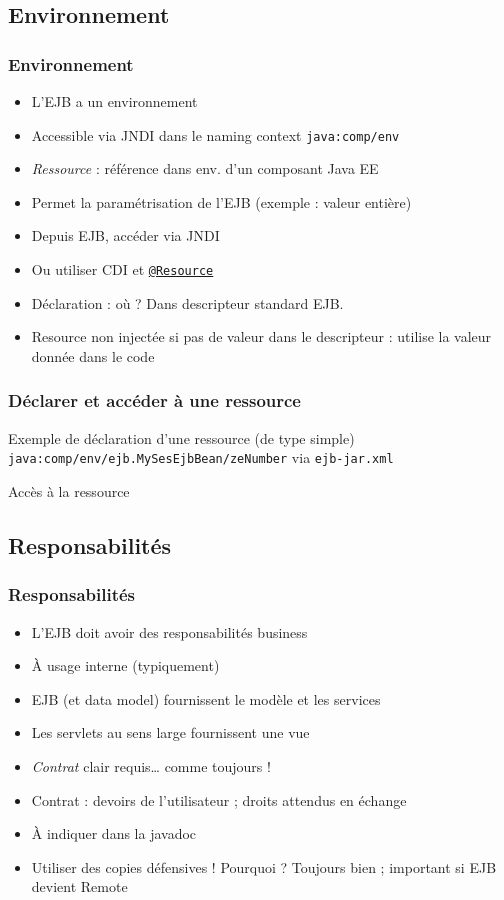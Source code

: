 \documentclass[english, french]{beamer}
\begin{document}
\subsection{Environnement}
\begin{frame}
	\frametitle{Environnement}
	\begin{itemize}
		\item L’EJB a un environnement
		\item Accessible via JNDI dans le naming context \texttt{java:comp/env}
		\item \emph{Ressource} : référence dans env. d’un composant Java EE
		\item Permet la paramétrisation de l’EJB (exemple : valeur entière)
		\item Depuis EJB, accéder via JNDI
		\item Ou utiliser CDI et \href{https://docs.oracle.com/javaee/7/api/javax/annotation/Resource.html}{\texttt{@Resource}}
		\item Déclaration : où ? \pause Dans descripteur standard EJB.\pause
		\item Resource non injectée si pas de valeur dans le descripteur : utilise la valeur donnée dans le code
	\end{itemize}
\end{frame}

\begin{frame}[fragile]
	\frametitle{Déclarer et accéder à une ressource}
	Exemple de déclaration d’une ressource (de type \og{}simple\fg{}) \texttt{java:comp/env/ejb.MySesEjbBean/zeNumber} via \texttt{ejb-jar.xml}
	
	Accès à la ressource
	
\end{frame}

\subsection{Responsabilités}
\begin{frame}
	\frametitle{Responsabilités}
	\begin{itemize}
		\item L’EJB doit avoir des responsabilités business
		\item À usage interne {\tiny (typiquement)}
		\item EJB {\tiny (et data model)} fournissent le modèle et les services
		\item Les servlets {\tiny au sens large} fournissent une vue
		\item \emph{Contrat} clair requis… comme toujours !
		\item Contrat : devoirs de l’utilisateur ; droits attendus en échange
		\item À indiquer dans la javadoc
		\item Utiliser des copies défensives ! Pourquoi ? \pause Toujours bien ; important si EJB devient Remote
	\end{itemize}
\end{frame}
\end{document}
